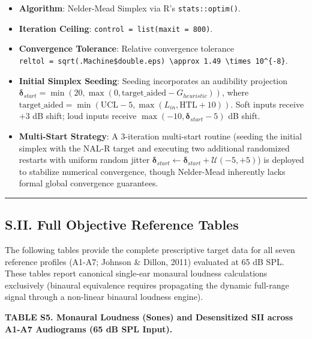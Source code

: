\documentclass[
  12pt,
]{article}
\providecommand{\tightlist}{%
  \setlength{\itemsep}{0pt}\setlength{\parskip}{0pt}}
\begin{document}
\begin{itemize}
\tightlist
\item
  \textbf{Algorithm}: Nelder-Mead Simplex via R's
  \texttt{stats::optim()}.
\item
  \textbf{Iteration Ceiling}: \texttt{control\ =\ list(maxit\ =\ 800)}.
\item
  \textbf{Convergence Tolerance}: Relative convergence tolerance
  \texttt{reltol\ =\ sqrt(.Machine\$double.eps)\ \textbackslash{}approx\ 1.49\ \textbackslash{}times\ 10\^{}\{-8\}}.
\item
  \textbf{Initial Simplex Seeding}: Seeding incorporates an audibility
  projection
  \(\boldsymbol{\delta}_{start} = \min(20, \max(0, \text{target\_aided} - G_{heuristic}))\),
  where
  \(\text{target\_aided} = \min(\text{UCL} - 5, \max(L_{in}, \text{HTL} + 10))\).
  Soft inputs receive \(+3\) dB shift; loud inputs receive
  \(\max(-10, \boldsymbol{\delta}_{start} - 5)\) dB shift.
\item
  \textbf{Multi-Start Strategy}: A 3-iteration multi-start routine
  (seeding the initial simplex with the NAL-R target and executing two
  additional randomized restarts with uniform random jitter
  \(\boldsymbol{\delta}_{start} \leftarrow \boldsymbol{\delta}_{start} + \mathcal{U}(-5, +5)\))
  is deployed to stabilize numerical convergence, though Nelder-Mead
  inherently lacks formal global convergence guarantees.
\end{itemize}

\begin{center}\rule{0.5\linewidth}{0.5pt}\end{center}

\subsection{S.II. Full Objective Reference
Tables}\label{s.ii.-full-objective-reference-tables}

The following tables provide the complete prescriptive target data for
all seven reference profiles (A1-A7; Johnson \& Dillon, 2011) evaluated
at 65 dB SPL. These tables report canonical single-ear monaural loudness
calculations exclusively (binaural equivalence requires propagating the
dynamic full-range signal through a non-linear binaural loudness
engine).

\textbf{TABLE S5. Monaural Loudness (Sones) and Desensitized SII across
A1-A7 Audiograms (65 dB SPL Input).}
\end{document}
